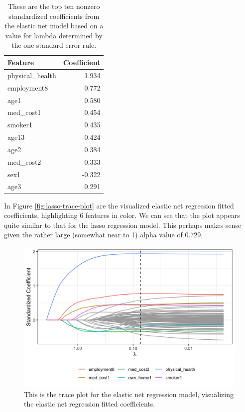 \documentclass[
]{article}
\begin{document}
\begin{table}[H]

\caption{\label{tab:top-10-elnet-coefficients}These are the top ten nonzero standardized coefficients 
        from the elastic net model based on a value for lambda determined by 
        the one-standard-error rule.}
\centering
\begin{tabular}[t]{lr}
\toprule
Feature & Coefficient\\
\midrule
physical\_health & 1.934\\
employment8 & 0.772\\
age1 & 0.580\\
med\_cost1 & 0.454\\
smoker1 & 0.435\\
\addlinespace
age13 & -0.424\\
age2 & 0.384\\
med\_cost2 & -0.333\\
sex1 & -0.322\\
age3 & 0.291\\
\bottomrule
\end{tabular}
\end{table}

In Figure \ref{fig:lasso-trace-plot} are the visualized elastic net regression fitted coefficients, highlighting 6 features in color. We can see that the plot appears quite similar to that for the lasso regression model. This perhaps makes sense given the rather large (somewhat near to 1) alpha value of 0.729.

\begin{figure}[H]

{\centering \includegraphics[width=0.8\linewidth]{../results/elnet-trace-plot} 

}

\caption{This is the trace plot for the elastic net regression model, visualizing the elastic net regression fitted coefficients.}\label{fig:elnet-trace-plot}
\end{figure}
\end{document}
